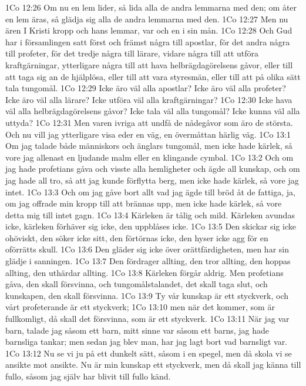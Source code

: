 1Co 12:26  Om nu en lem lider, så lida alla de andra lemmarna med den; om åter en lem äras, så glädja sig alla de andra lemmarna med den.
1Co 12:27  Men nu ären I Kristi kropp och hans lemmar, var och en i sin mån.
1Co 12:28  Och Gud har i församlingen satt först och främst några till apostlar, för det andra några till profeter, för det tredje några till lärare, vidare några till att utföra kraftgärningar, ytterligare några till att hava helbrägdagörelsens gåvor, eller till att taga sig an de hjälplösa, eller till att vara styresmän, eller till att på olika sätt tala tungomål.
1Co 12:29  Icke äro väl alla apostlar? Icke äro väl alla profeter? Icke äro väl alla lärare? Icke utföra väl alla kraftgärningar?
1Co 12:30  Icke hava väl alla helbrägdagörelsens gåvor? Icke tala väl alla tungomål? Icke kunna väl alla uttyda?
1Co 12:31  Men varen ivriga att undfå de nådegåvor som äro de största. Och nu vill jag ytterligare visa eder en väg, en övermåttan härlig väg.
1Co 13:1  Om jag talade både människors och änglars tungomål, men icke hade kärlek, så vore jag allenast en ljudande malm eller en klingande cymbal.
1Co 13:2  Och om jag hade profetians gåva och visste alla hemligheter och ägde all kunskap, och om jag hade all tro, så att jag kunde förflytta berg, men icke hade kärlek, så vore jag intet.
1Co 13:3  Och om jag gåve bort allt vad jag ägde till bröd åt de fattiga, ja, om jag offrade min kropp till att brännas upp, men icke hade kärlek, så vore detta mig till intet gagn.
1Co 13:4  Kärleken är tålig och mild. Kärleken avundas icke, kärleken förhäver sig icke, den uppblåses icke.
1Co 13:5  Den skickar sig icke ohöviskt, den söker icke sitt, den förtörnas icke, den hyser icke agg för en oförrätts skull.
1Co 13:6  Den gläder sig icke över orättfärdigheten, men har sin glädje i sanningen.
1Co 13:7  Den fördrager allting, den tror allting, den hoppas allting, den uthärdar allting.
1Co 13:8  Kärleken förgår aldrig. Men profetians gåva, den skall försvinna, och tungomålstalandet, det skall taga slut, och kunskapen, den skall försvinna.
1Co 13:9  Ty vår kunskap är ett styckverk, och vårt profeterande är ett styckverk;
1Co 13:10  men när det kommer, som är fullkomligt, då skall det försvinna, som är ett styckverk.
1Co 13:11  När jag var barn, talade jag såsom ett barn, mitt sinne var såsom ett barns, jag hade barnsliga tankar; men sedan jag blev man, har jag lagt bort vad barnsligt var.
1Co 13:12  Nu se vi ju på ett dunkelt sätt, såsom i en spegel, men då skola vi se ansikte mot ansikte. Nu är min kunskap ett styckverk, men då skall jag känna till fullo, såsom jag själv har blivit till fullo känd.

